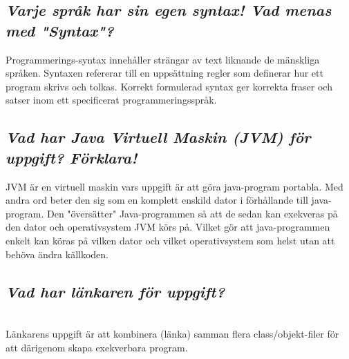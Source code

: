 \documentclass[../main.tex]{subfiles}
\begin{document}
\subsection{\textit{Varje språk har sin egen syntax! Vad menas med "Syntax"?}}

Programmerings-syntax innehåller strängar av text liknande de mänskliga språken. Syntaxen refererar till en uppsättning regler som definerar hur ett program skrivs och tolkas. Korrekt formulerad syntax ger korrekta fraser och satser inom ett specificerat programmeringsspråk.

\subsection{\textit{Vad har Java Virtuell Maskin (JVM) för uppgift? Förklara!}}

JVM är en virtuell maskin vars uppgift är att göra java-program portabla. Med andra ord beter den sig som en komplett enskild dator i förhållande till java-program. 
Den "översätter" Java-programmen så att de sedan kan exekveras på den dator och operativsystem JVM körs på. Vilket gör att java-programmen enkelt kan köras på vilken dator och vilket operativsystem som helst utan att behöva ändra källkoden.

\subsection{\textit{Vad har länkaren för uppgift?}}

\\
Länkarens uppgift är att kombinera (länka) samman flera class/objekt-filer för att därigenom skapa exekverbara program.
\end{document}
